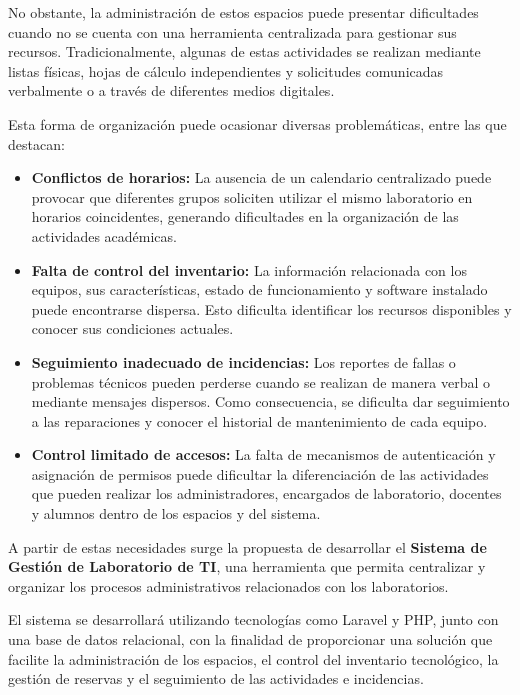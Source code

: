 No obstante, la administración de estos espacios puede presentar dificultades cuando no se cuenta con una herramienta centralizada para gestionar sus recursos. Tradicionalmente, algunas de estas actividades se realizan mediante listas físicas, hojas de cálculo independientes y solicitudes comunicadas verbalmente o a través de diferentes medios digitales.

Esta forma de organización puede ocasionar diversas problemáticas, entre las que destacan:

\begin{itemize}[leftmargin=*]

    \item \textbf{Conflictos de horarios:}
    La ausencia de un calendario centralizado puede provocar que diferentes grupos soliciten utilizar el mismo laboratorio en horarios coincidentes, generando dificultades en la organización de las actividades académicas.

    \item \textbf{Falta de control del inventario:}
    La información relacionada con los equipos, sus características, estado de funcionamiento y software instalado puede encontrarse dispersa. Esto dificulta identificar los recursos disponibles y conocer sus condiciones actuales.

    \item \textbf{Seguimiento inadecuado de incidencias:}
    Los reportes de fallas o problemas técnicos pueden perderse cuando se realizan de manera verbal o mediante mensajes dispersos. Como consecuencia, se dificulta dar seguimiento a las reparaciones y conocer el historial de mantenimiento de cada equipo.

    \item \textbf{Control limitado de accesos:}
    La falta de mecanismos de autenticación y asignación de permisos puede dificultar la diferenciación de las actividades que pueden realizar los administradores, encargados de laboratorio, docentes y alumnos dentro de los espacios y del sistema.

\end{itemize}

A partir de estas necesidades surge la propuesta de desarrollar el \textbf{Sistema de Gestión de Laboratorio de TI}, una herramienta que permita centralizar y organizar los procesos administrativos relacionados con los laboratorios.

El sistema se desarrollará utilizando tecnologías como Laravel y PHP, junto con una base de datos relacional, con la finalidad de proporcionar una solución que facilite la administración de los espacios, el control del inventario tecnológico, la gestión de reservas y el seguimiento de las actividades e incidencias.


